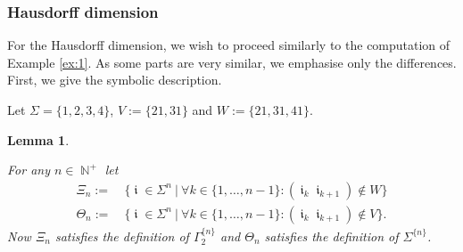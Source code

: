 \documentclass[a4paper, 11pt]{article}
\DeclareMathOperator{\N}{\mathbb{N}}
\DeclareMathOperator{\iii}{\mathfrak{i}}
\numberwithin{equation}{section}
\theoremstyle{plain}
\newtheorem{lemma}[theorem]{Lemma}
\theoremstyle{remark}
\theoremstyle{definition}
\begin{document}
\subsubsection{Hausdorff dimension}
For the Hausdorff dimension, we wish to proceed similarly to the computation of Example \ref{ex:1}. As some parts are very similar, we emphasise only the differences. First, we give the symbolic description.

 Let $\Sigma = \{1,2,3,4\}$, $V := \{21,31\}$ and $W := \{ 21, 31, 41\}$.

\begin{lemma} \label{ex2l1}

For any $n \in \N^+$ let 
\begin{align*}
\Xi_n :=&\ \Big\{ \iii \in \Sigma^n \ \Big| \ \forall k \in \{1,\dots,n-1\}: (\iii_k \iii_{k+1}) \notin W \Big\} \\
\Theta_n :=&\ \Big\{ \iii \in \Sigma^n \ \Big| \ \forall k \in \{1,\dots,n-1\}: (\iii_k \iii_{k+1}) \notin V \Big\}.
\end{align*}
Now $\Xi_n$ satisfies the definition of $\Gamma_2^{\{n\}}$ and $\Theta_n$ satisfies the definition of $\Sigma^{\{n\}}$.
\end{lemma}
\end{document}
